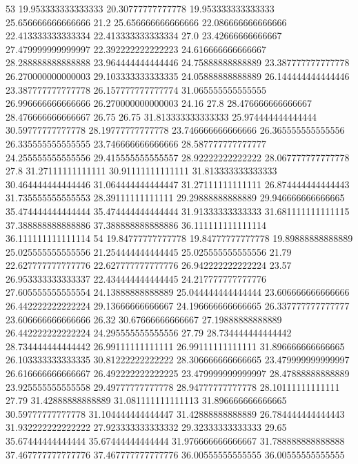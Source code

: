 53 19.953333333333333 20.30777777777778 19.953333333333333 25.656666666666666 21.2 25.656666666666666 22.086666666666666 22.413333333333334 22.413333333333334 27.0 23.42666666666667 27.479999999999997 22.392222222222223 24.616666666666667 28.288888888888888 23.964444444444446 24.75888888888889 23.387777777777778 26.270000000000003 29.103333333333335 24.05888888888889 26.144444444444446 23.387777777777778 26.157777777777774 31.065555555555555 26.996666666666666 26.270000000000003 24.16 27.8 28.476666666666667 28.476666666666667 26.75 26.75 31.813333333333333 25.974444444444444 30.59777777777778 28.19777777777778 23.746666666666666 26.365555555555556 26.335555555555555 23.746666666666666 28.587777777777777 24.255555555555556 29.415555555555557 28.92222222222222 28.067777777777778 27.8 31.27111111111111 30.91111111111111 31.813333333333333 30.464444444444446 31.064444444444447 31.27111111111111 26.874444444444443 31.735555555555553 28.39111111111111 29.29888888888889 29.946666666666665 35.474444444444444 35.474444444444444 31.91333333333333 31.681111111111115 37.388888888888886 37.388888888888886 36.111111111111114 36.111111111111114
54 19.84777777777778 19.84777777777778 19.89888888888889 25.025555555555556 21.254444444444445 25.025555555555556 21.79 22.627777777777776 22.627777777777776 26.942222222222224 23.57 26.953333333333337 22.434444444444445 24.217777777777776 27.605555555555554 24.13888888888889 25.044444444444444 23.606666666666666 26.442222222222224 29.13666666666667 24.196666666666665 26.337777777777777 23.606666666666666 26.32 30.67666666666667 27.19888888888889 26.442222222222224 24.295555555555556 27.79 28.734444444444442 28.734444444444442 26.99111111111111 26.99111111111111 31.896666666666665 26.103333333333335 30.81222222222222 28.306666666666665 23.479999999999997 26.616666666666667 26.492222222222225 23.479999999999997 28.47888888888889 23.925555555555558 29.49777777777778 28.94777777777778 28.10111111111111 27.79 31.42888888888889 31.081111111111113 31.896666666666665 30.59777777777778 31.104444444444447 31.42888888888889 26.784444444444443 31.932222222222222 27.923333333333332 29.32333333333333 29.65 35.67444444444444 35.67444444444444 31.976666666666667 31.788888888888888 37.467777777777776 37.467777777777776 36.00555555555555 36.00555555555555
